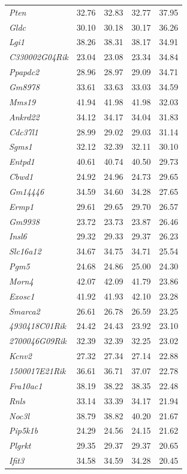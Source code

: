 \documentclass{article}
\begin{document}
\begin{table}[ht]
\begin{tabular}{>{\em}lrrrr}
  Pten & 32.76 & 32.83 & 32.77 & 37.95 \\ 
  Gldc & 30.10 & 30.18 & 30.17 & 36.26 \\ 
  Lgi1 & 38.26 & 38.31 & 38.17 & 34.91 \\ 
  C330002G04Rik & 23.04 & 23.08 & 23.34 & 34.84 \\ 
  Ppapdc2 & 28.96 & 28.97 & 29.09 & 34.71 \\ 
  Gm8978 & 33.61 & 33.63 & 33.03 & 34.59 \\ 
  Mms19 & 41.94 & 41.98 & 41.98 & 32.03 \\ 
  Ankrd22 & 34.12 & 34.17 & 34.04 & 31.83 \\ 
  Cdc37l1 & 28.99 & 29.02 & 29.03 & 31.14 \\ 
  Sgms1 & 32.12 & 32.39 & 32.11 & 30.10 \\ 
  Entpd1 & 40.61 & 40.74 & 40.50 & 29.73 \\ 
  Cbwd1 & 24.92 & 24.96 & 24.73 & 29.65 \\ 
  Gm14446 & 34.59 & 34.60 & 34.28 & 27.65 \\ 
  Ermp1 & 29.61 & 29.65 & 29.70 & 26.57 \\ 
  Gm9938 & 23.72 & 23.73 & 23.87 & 26.46 \\ 
  Insl6 & 29.32 & 29.33 & 29.37 & 26.23 \\ 
  Slc16a12 & 34.67 & 34.75 & 34.71 & 25.54 \\ 
  Pgm5 & 24.68 & 24.86 & 25.00 & 24.30 \\ 
  Morn4 & 42.07 & 42.09 & 41.79 & 23.86 \\ 
  Exosc1 & 41.92 & 41.93 & 42.10 & 23.28 \\ 
  Smarca2 & 26.61 & 26.78 & 26.59 & 23.25 \\ 
  4930418C01Rik & 24.42 & 24.43 & 23.92 & 23.10 \\ 
  2700046G09Rik & 32.39 & 32.39 & 32.25 & 23.02 \\ 
  Kcnv2 & 27.32 & 27.34 & 27.14 & 22.88 \\ 
  1500017E21Rik & 36.61 & 36.71 & 37.07 & 22.78 \\ 
  Fra10ac1 & 38.19 & 38.22 & 38.35 & 22.48 \\ 
  Rnls & 33.14 & 33.39 & 34.17 & 21.94 \\ 
  Noc3l & 38.79 & 38.82 & 40.20 & 21.67 \\ 
  Pip5k1b & 24.29 & 24.56 & 24.15 & 21.62 \\ 
  Plgrkt & 29.35 & 29.37 & 29.37 & 20.65 \\ 
  Ifit3 & 34.58 & 34.59 & 34.28 & 20.45 \\ 

\end{tabular}
\end{table}
\end{document}
